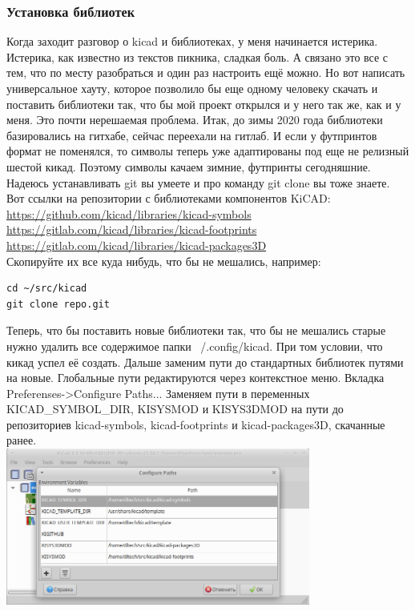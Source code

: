 \documentclass[12pt,a4paper]{article}
\begin{document}
\subsubsection{Установка библиотек}
    Когда заходит разговор о kicad и библиотеках, у меня начинается истерика.
    Истерика, как известно из текстов пикника, сладкая боль. А связано это все
    с тем, что по месту разобраться и один раз настроить ещё можно. Но вот
    написать универсальное хауту, которое позволило бы еще одному
    человеку скачать и поставить библиотеки так, что бы мой проект открылся и
    у него так же, как и у меня. Это почти нерешаемая проблема.
    Итак, до зимы 2020 года библиотеки базировались на гитхабе, сейчас переехали
    на гитлаб. И если у футпринтов формат не поменялся, то символы теперь уже
    адаптированы под еще не релизный шестой кикад. Поэтому символы качаем
    зимние, футпринты сегодняшние. Надеюсь устанавливать git вы умеете и про
    команду git clone вы тоже знаете.
    Вот ссылки на репозитории с библиотеками компонентов KiCAD:\\
    \url{https://github.com/kicad/libraries/kicad-symbols}\\
    \url{https://gitlab.com/kicad/libraries/kicad-footprints}\\
    \url{https://gitlab.com/kicad/libraries/kicad-packages3D}\\
    Скопируйте их все куда нибудь, что бы не мешались, например:\\
\begin{lstlisting}
cd ~/src/kicad
git clone repo.git
\end{lstlisting}
    Теперь, что бы поставить новые библиотеки так, что бы не мешались старые
    нужно удалить все содержимое папки ~/.config/kicad. При том условии, что
    кикад успел её создать. Дальше заменим пути
    до стандартных библиотек путями на новые. Глобальные пути редактируются
    через контекстное меню. Вкладка Preferenses->Configure Paths...
    Заменяем пути в переменных KICAD\_SYMBOL\_DIR, KISYSMOD и KISYS3DMOD на пути
    до репозиториев kicad-symbols, kicad-footprints и kicad-packages3D, скачанные
    ранее.\\
    \includegraphics[width=10cm]{kipath.png}\\
\end{document}
